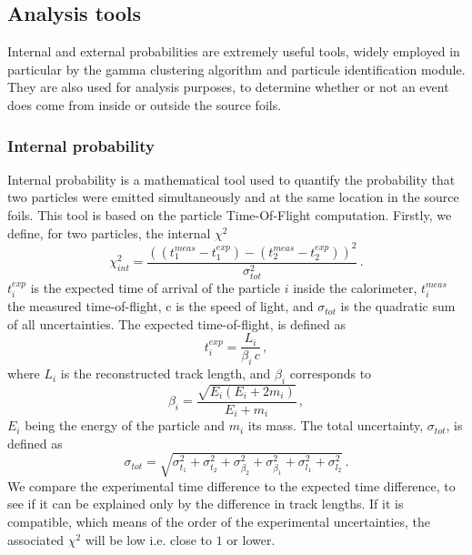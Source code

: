 \subsection{Analysis tools}

Internal and external probabilities are extremely useful tools, widely employed in particular by the gamma clustering algorithm and particule identification module.
They are also used for analysis purposes, to determine whether or not an event does come from inside or outside the source foils.

\subsubsection{Internal probability}
\label{subsec:internal_prob}

Internal probability is a mathematical tool used to quantify the probability that two particles were emitted simultaneously and at the same location in the source foils.
This tool is based on the particle Time-Of-Flight computation.
Firstly, we define, for two particles, the internal $\chi^{2}$
\begin{equation}
  \chi^{2}_{int}=\frac{((t^{meas}_{1} - t^{exp}_{1}) - (t^{meas}_{2} - t^{exp}_{2}))^{2}}{\sigma_{tot}^{2}}\,.
  \label{eq:int_chi2}
\end{equation}
$t^{exp}_{i}$ is the expected time of arrival of the particle $i$ inside the calorimeter, $t^{meas}_{i}$ the measured time-of-flight, c is the speed of light, and $\sigma_{tot}$ is the quadratic sum of all uncertainties.
The expected time-of-flight, is defined as
\begin{equation}
  t^{exp}_{i}=\frac{L_{i}}{\beta_{i}\,c}\,,
  \label{eq:th_time}
\end{equation}
where $L_{i}$ is the reconstructed track length, and $\beta_{i}$ corresponds to
\begin{equation}
  \beta_{i}=\frac{\sqrt{E_{i}(E_{i} + 2m_{i})}}{E_{i} + m_{i}}\,,
  \label{eq:beta_i}
\end{equation}
$E_{i}$ being the energy of the particle and $m_{i}$ its mass.
The total uncertainty, $\sigma_{tot}$, is defined as
\begin{equation}
  \sigma_{tot}=\sqrt{\sigma_{t_{1}}^{2}+\sigma_{t_{2}}^{2}+\sigma_{\beta_{2}}^{2}+\sigma_{\beta_{1}}^{2}+\sigma_{l_{1}}^{2}+\sigma_{l_{2}}^{2}} \,.
  \label{eq:sigma_tot}
\end{equation}
We compare the experimental time difference to the expected time difference, to see if it can be explained only by the difference in track lengths.
If it is compatible, which means of the order of the experimental uncertainties, the associated $\chi^{2}$ will be low i.e. close to $1$ or lower.

